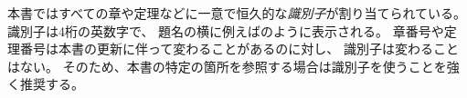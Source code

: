 \documentclass[index]{subfiles}
\begin{document}

本書ではすべての章や定理などに一意で恒久的な\emph{識別子}が割り当てられている。
識別子は4桁の英数字で、
題名の横に例えばのように表示される。
章番号や定理番号は本書の更新に伴って変わることがあるのに対し、
識別子は変わることはない。
そのため、本書の特定の箇所を参照する場合は識別子を使うことを強く推奨する。
\end{document}
